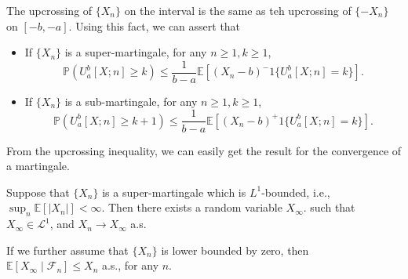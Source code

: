 \begin{remark}
The upcrossing of $\{X_n\}$ on the interval is the same as teh upcrossing of $\{-X_n\}$ on $[-b,-a]$.
Using this fact, we can assert that
\begin{itemize}
\item
If $\{X_n\}$ is a super-martingale, for any $n\ge1,k\ge1$,
\[
\mathbb{P}\left(
U_a^b[X;n]\ge k
\right)\le \frac{1}{b-a}\mathbb{E}\left[
(X_n -b)^-1\{U_a^b[X;n]=k\}
\right].
\]
\item
If $\{X_n\}$ is a sub-martingale, for any $n\ge1,k\ge1$,
\[
\mathbb{P}\left(
U_a^b[X;n]\ge k+1
\right)\le \frac{1}{b-a}\mathbb{E}\left[
(X_n -b)^+1\{U_a^b[X;n]=k\}
\right].
\]
\end{itemize}
\end{remark}

From the upcrossing inequality, we can easily get the result for the convergence of a martingale.
\begin{theorem}
Suppose that $\{X_n\}$ is a super-martingale which is ${L}^1$-bounded, i.e., $\sup_n\mathbb{E}[|X_n|]<\infty$.
Then there exists a random variable $X_\infty$. such that $X_{\infty}\in\mathcal{L}^1$, and $X_n\to X_\infty$ a.s.

If we further assume that $\{X_n\}$ is lower bounded by zero, then $\mathbb{E}[X_\infty\mid\mathcal{F}_n]\le X_n$ a.s., for any $n$.
\end{theorem}
